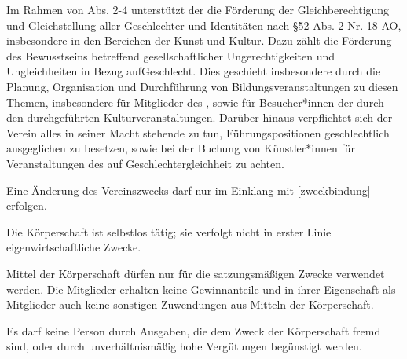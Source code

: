 \begin{contract}
    Im Rahmen von   Abs. 2-4 unterstützt der \name die Förderung der Gleichberechtigung und Gleichstellung aller Geschlechter und Identitäten nach \S 52 Abs. 2 Nr. 18 AO, insbesondere in den Bereichen der Kunst und Kultur. Dazu zählt die Förderung des Bewusstseins betreffend gesellschaftlicher Ungerechtigkeiten und Ungleichheiten in Bezug aufGeschlecht. Dies geschieht insbesondere durch die Planung, Organisation und Durchführung von Bildungsveranstaltungen zu diesen Themen, insbesondere für Mitglieder des \name, sowie für Besucher*innen der durch den \name durchgeführten Kulturveranstaltungen. Darüber hinaus verpflichtet sich der Verein alles in seiner Macht stehende zu tun, Führungspositionen geschlechtlich ausgeglichen zu besetzen, sowie bei der Buchung von Künstler*innen für Veranstaltungen des \name auf Geschlechtergleichheit zu achten.

    Eine Änderung des Vereinszwecks darf nur im Einklang mit \ref{zweckbindung} erfolgen.

    Die Körperschaft ist selbstlos tätig; sie verfolgt nicht in erster Linie eigenwirtschaftliche Zwecke.

    Mittel der Körperschaft dürfen nur für die satzungsmäßigen Zwecke verwendet werden. Die Mitglieder erhalten keine Gewinnanteile und in ihrer Eigenschaft als Mitglieder auch keine sonstigen Zuwendungen aus Mitteln der Körperschaft.

    Es darf keine Person durch Ausgaben, die dem Zweck der Körperschaft fremd sind, oder durch unverhältnismäßig hohe Vergütungen begünstigt werden.

\end{contract}

